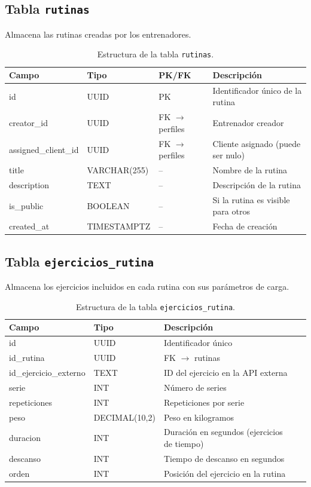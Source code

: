 \subsection{Tabla \texttt{rutinas}}

Almacena las rutinas creadas por los entrenadores.

\begin{table}[H]
\centering
\begin{tabular}{@{}llll@{}}
\toprule
\textbf{Campo} & \textbf{Tipo} & \textbf{PK/FK} & \textbf{Descripción} \\
\midrule
id & UUID & PK & Identificador único de la rutina \\
creator\_id & UUID & FK $\to$ perfiles & Entrenador creador \\
assigned\_client\_id & UUID & FK $\to$ perfiles & Cliente asignado (puede ser nulo) \\
title & VARCHAR(255) & -- & Nombre de la rutina \\
description & TEXT & -- & Descripción de la rutina \\
is\_public & BOOLEAN & -- & Si la rutina es visible para otros \\
created\_at & TIMESTAMPTZ & -- & Fecha de creación \\
\bottomrule
\end{tabular}
\caption{Estructura de la tabla \texttt{rutinas}.}
\end{table}

\subsection{Tabla \texttt{ejercicios\_rutina}}

Almacena los ejercicios incluidos en cada rutina con sus parámetros de carga.

\begin{table}[H]
\centering
\begin{tabular}{@{}llll@{}}
\toprule
\textbf{Campo} & \textbf{Tipo} & \textbf{Descripción} \\
\midrule
id & UUID & Identificador único \\
id\_rutina & UUID & FK $\to$ rutinas \\
id\_ejercicio\_externo & TEXT & ID del ejercicio en la API externa \\
serie & INT & Número de series \\
repeticiones & INT & Repeticiones por serie \\
peso & DECIMAL(10,2) & Peso en kilogramos \\
duracion & INT & Duración en segundos (ejercicios de tiempo) \\
descanso & INT & Tiempo de descanso en segundos \\
orden & INT & Posición del ejercicio en la rutina \\
\bottomrule
\end{tabular}
\caption{Estructura de la tabla \texttt{ejercicios\_rutina}.}
\end{table}

